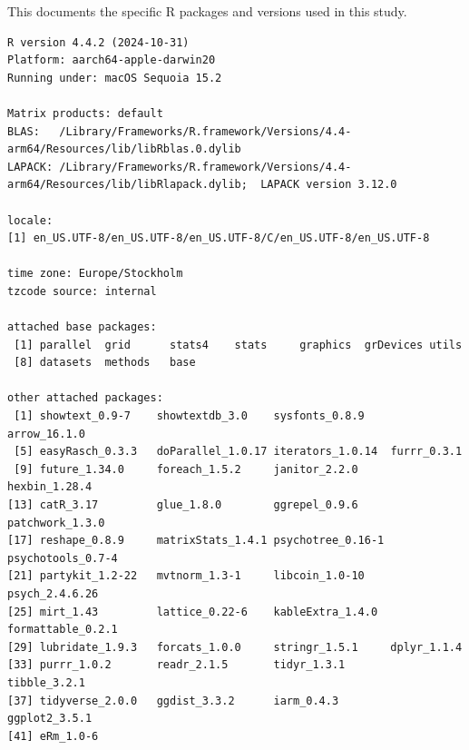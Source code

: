 \documentclass[
  letterpaper,
  DIV=11,
  numbers=noendperiod]{scrartcl}
\begin{document}
This documents the specific R packages and versions used in this study.

\begin{verbatim}
R version 4.4.2 (2024-10-31)
Platform: aarch64-apple-darwin20
Running under: macOS Sequoia 15.2

Matrix products: default
BLAS:   /Library/Frameworks/R.framework/Versions/4.4-arm64/Resources/lib/libRblas.0.dylib 
LAPACK: /Library/Frameworks/R.framework/Versions/4.4-arm64/Resources/lib/libRlapack.dylib;  LAPACK version 3.12.0

locale:
[1] en_US.UTF-8/en_US.UTF-8/en_US.UTF-8/C/en_US.UTF-8/en_US.UTF-8

time zone: Europe/Stockholm
tzcode source: internal

attached base packages:
 [1] parallel  grid      stats4    stats     graphics  grDevices utils    
 [8] datasets  methods   base     

other attached packages:
 [1] showtext_0.9-7    showtextdb_3.0    sysfonts_0.8.9    arrow_16.1.0     
 [5] easyRasch_0.3.3   doParallel_1.0.17 iterators_1.0.14  furrr_0.3.1      
 [9] future_1.34.0     foreach_1.5.2     janitor_2.2.0     hexbin_1.28.4    
[13] catR_3.17         glue_1.8.0        ggrepel_0.9.6     patchwork_1.3.0  
[17] reshape_0.8.9     matrixStats_1.4.1 psychotree_0.16-1 psychotools_0.7-4
[21] partykit_1.2-22   mvtnorm_1.3-1     libcoin_1.0-10    psych_2.4.6.26   
[25] mirt_1.43         lattice_0.22-6    kableExtra_1.4.0  formattable_0.2.1
[29] lubridate_1.9.3   forcats_1.0.0     stringr_1.5.1     dplyr_1.1.4      
[33] purrr_1.0.2       readr_2.1.5       tidyr_1.3.1       tibble_3.2.1     
[37] tidyverse_2.0.0   ggdist_3.3.2      iarm_0.4.3        ggplot2_3.5.1    
[41] eRm_1.0-6        


\end{verbatim}
\end{document}
